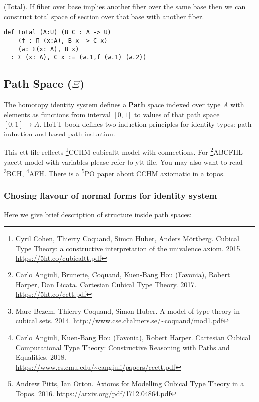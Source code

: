 \documentclass{article}
\begin{document}
\begin{theorem} (Total).
If fiber over base implies another fiber
over the same base then we can construct total space of section
over that base with another fiber.
\begin{lstlisting}
def total (A:U) (B C : A -> U)
    (f : Π (x:A), B x -> C x)
    (w: Σ(x: A), B x)
  : Σ (x: A), C x := (w.1,f (w.1) (w.2))
\end{lstlisting}
\end{theorem}

\subsection{Path Space ($\Xi$)}

The homotopy identity system defines a $\mathbf{Path}$ space indexed over type $A$
with elements as functions from interval $[0,1]$ to values
of that path space $[0,1] \rightarrow A$. HoTT book
defines two induction principles for identity types:
path induction and based path induction.

This ctt file reflects \footnote{Cyril Cohen, Thierry Coquand, Simon Huber, Anders M{\"{o}}rtberg. Cubical Type Theory: a constructive interpretation of the univalence axiom. 2015. \url{https://5ht.co/cubicaltt.pdf}}{CCHM} cubicaltt model with connections.
For \footnote{Carlo Angiuli, Brunerie, Coquand, Kuen-Bang Hou (Favonia), Robert Harper, Dan Licata. Cartesian Cubical Type Theory. 2017. \url{https://5ht.co/cctt.pdf}}{ABCFHL} yacctt model with
variables please refer to ytt file. You may also want to
read \footnote{Marc Bezem, Thierry Coquand, Simon Huber. A model of type theory in cubical sets. 2014. \url{http://www.cse.chalmers.se/~coquand/mod1.pdf}}{BCH},
\footnote{Carlo Angiuli, Kuen-Bang Hou (Favonia), Robert Harper. Cartesian Cubical Computational Type Theory: Constructive Reasoning with Paths and Equalities. 2018. \\ \url{https://www.cs.cmu.edu/~cangiuli/papers/ccctt.pdf}}{AFH}.
There is a \footnote{Andrew Pitts, Ian Orton. Axioms for Modelling Cubical Type Theory in a Topos. 2016. \url{https://arxiv.org/pdf/1712.04864.pdf}}{PO} paper about CCHM axiomatic in a topos.

\subsubsection*{Chosing flavour of normal forms for identity system}

Here we give brief description of structure inside path spaces:
\end{document}
